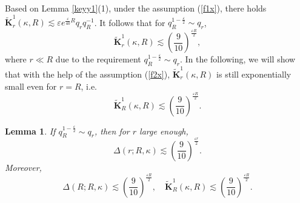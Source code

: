 \documentclass{amsart}
\newtheorem{Lemma}[Definition]{Lemma}
\theoremstyle{definition}
\begin{document}
Based on Lemma \ref{keyy1}(1),  under the assumption (\ref{f1x}), there holds $\widetilde{\mathbf{K}}_r^1(\kappa,R)\lesssim \varepsilon e^{\frac{\varepsilon}{40}R}q_rq_R^{-1}$. It follows that for $q_R^{1-\frac{\varepsilon}{2}}\sim q_r$,
\begin{equation}\label{KES}
\widetilde{\mathbf{K}}_r^1(\kappa,R)\lesssim (\frac{9}{10})^{\frac{\varepsilon R}{2}},
\end{equation}
where $r\ll R$ due to the requirement $q_R^{1-\frac{\varepsilon}{2}}\sim q_r$. In the following, we will show that with the help of the assumption (\ref{f2x}), $\widetilde{\mathbf{K}}_r^1(\kappa,R)$ is still exponentially small even for $r=R$, i.e.
\[\widetilde{\mathbf{K}}_R^1(\kappa,R)\lesssim (\frac{9}{10})^{\frac{\varepsilon R}{2}}.\]
\begin{Lemma}\label{karrr1} If $q_R^{1-\frac{\varepsilon}{2}}\sim q_r$, then for $r$ large enough,
\begin{equation}\label{karrr}
\Delta(r;R,\kappa)\lesssim (\frac{9}{10})^{\frac{\varepsilon r}{2}}.
\end{equation}
Moreover,
\[\Delta(R;R,\kappa)\lesssim (\frac{9}{10})^{\frac{\varepsilon R}{2}},\quad \widetilde{\mathbf{K}}_R^1(\kappa,R)\lesssim (\frac{9}{10})^{\frac{\varepsilon R}{2}}.\]
\end{Lemma}
\end{document}
